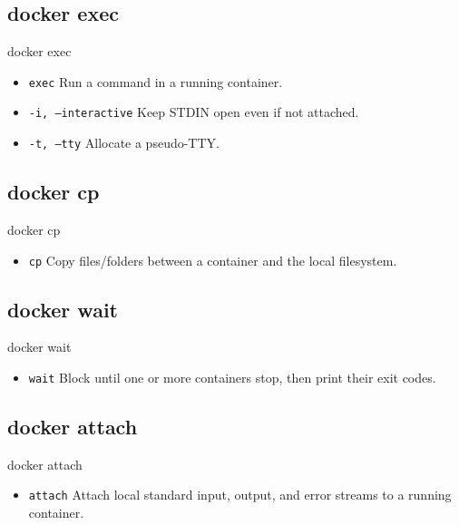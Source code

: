 \subsection{docker exec}\label{subsec:docker-exec}
\begin{frame}{docker exec}
    \begin{itemize}
        \item \texttt{exec} Run a command in a running container.
        \pause
        \item \texttt{-i, --interactive} Keep STDIN open even if not attached.
        \pause
        \item \texttt{-t, --tty} Allocate a pseudo-TTY.
        \pause
        
    \end{itemize}
\end{frame}

\subsection{docker cp}\label{subsec:docker-cp}
\begin{frame}{docker cp}
    \begin{itemize}
        \item \texttt{cp} Copy files/folders between a container and the local filesystem.
        \pause
        
    \end{itemize}
\end{frame}

\subsection{docker wait}\label{subsec:docker-wait}
\begin{frame}{docker wait}
    \begin{itemize}
        \item \texttt{wait} Block until one or more containers stop, then print their exit codes.
        \pause
        
    \end{itemize}
\end{frame}

\subsection{docker attach}\label{subsec:docker-attach}
\begin{frame}{docker attach}
    \begin{itemize}
        \item \texttt{attach} Attach local standard input, output, and error streams to a running container.
        \pause
        
    \end{itemize}
\end{frame}
